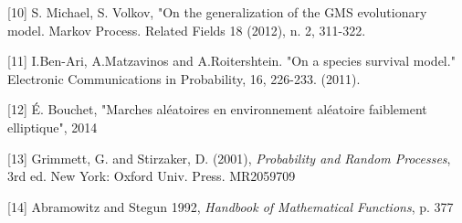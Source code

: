 \documentclass[12pt,a4paper]{article}
\begin{document}
[10] S. Michael, S. Volkov, "On the generalization of the GMS evolutionary model. Markov Process. Related Fields 18 (2012), n. 2, 311-322.\par

[11] I.Ben-Ari, A.Matzavinos and A.Roitershtein. "On a species survival model." Electronic Communications in Probability, 16, 226-233. (2011).\par

[12] É. Bouchet, "Marches aléatoires en environnement aléatoire faiblement elliptique", 2014

[13] Grimmett, G. and Stirzaker, D. (2001), \textit{Probability and Random Processes}, 3rd ed. New York: Oxford Univ. Press. MR2059709 \par

[14] Abramowitz and Stegun 1992, \textit{Handbook of Mathematical Functions}, p. 377
\end{document}
